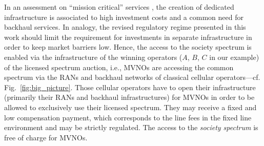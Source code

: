 \documentclass[conference]{IEEEtran}
\begin{document}
In an assessment on ``mission critical'' services \cite{forge2013}, the creation of dedicated infrastructure is associated to high investment costs and a common need for backhaul services. In analogy,  the revised regulatory regime presented in this work should limit the requirement for investments in separate infrastructure in order to keep market barriers low. Hence, the access to the society spectrum is enabled via the infrastructure of the winning operators ($A$, $B$, $C$ in our example) of the licensed spectrum auction, i.e., MVNOs are accessing the common spectrum via the RANs and backhaul networks of classical cellular operators---cf. Fig.~\ref{fig:big_picture}. Those cellular operators have to open their infrastructure (primarily their RANs and backhaul infrastructures) for MVNOs in order to be allowed to exclusively use their licensed spectrum. They may receive a fixed and low compensation payment, which corresponds to the line fees in the fixed line environment and may be strictly regulated. The access to the  \textit{society spectrum} is free of charge for MVNOs.
\end{document}
